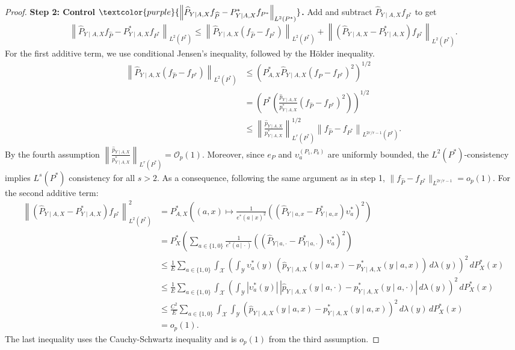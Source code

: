 \documentclass{article}
\theoremstyle{plain}
\theoremstyle{definition}
\theoremstyle{remark}
\newcommand{\of}[1]{\left(#1\right)}
\newcommand{\abs}[1]{\left|#1\right|}
\newcommand{\cO}{\mathcal{O}}
\newcommand{\cY}{\mathcal{Y}}
\newcommand{\cX}{\mathcal{X}}
\newcommand{\wh}[1]{\widehat{#1}}
\newcommand{\hP}{\widehat{P}}
\newcommand{\1}{\mathbbm{1}}
\newcommand{\norm}[1]{\left \| #1 \right \|}
\theoremstyle{plain}
\theoremstyle{definition}
\newcommand{\mymid}{\,|\,}
\begin{document}
\begin{proof}
    \textbf{Step 2: Control $\textcolor{purple}{\norm{\hP_{Y \mid A, X}f_{\hP} - P^*_{Y \mid A, X}f_{P^*}}_{L^2(P^*)}}$.} Add and subtract $\hP_{Y \mid A, X} f_{P^*}$ to get
    \[
    \norm{\hP_{Y \mid A, X}f_{\hP} - P^*_{Y \mid A, X}f_{P^*}}_{L^2(P^*)} \leq \norm{ \hP_{Y \mid A, X} \of{f_{\hP} - f_{P^*}}}_{L^2(P^*)} + \norm{  \of{\hP_{Y \mid A, X} - P^*_{Y \mid A, X}} f_{P^*}}_{L^2(P^*)}.
    \]
    For the first additive term, we use conditional Jensen's inequality, followed by the Hölder inequality.
    \begin{align*}
        \norm{\hP_{Y \mid A, X} \of{f_{\hP} - f_{P^*}}}_{L^2(P^*)} &\leq \of{P^*_{A, X} \hP_{Y \mid A, X} (f_{\hP} -f_{P^*})^2}^{1/2}\\
        &= \of{P^* \of {\frac{\wh{p}_{Y \mid A, X}}{p^*_{Y \mid A, X}} (f_{\hP} -f_{P^*})^2}}^{1/2}\\
        &\leq \norm{\frac{\wh{p}_{Y \mid A, X}}{p^*_{Y \mid A, X}}}_{L^r(P^*)}^{1/2}  \norm{f_{\hP} - f_{P^*}}_{L^{2r/r-1}(P^*)}.
    \end{align*}
    By the fourth assumption $\norm{\frac{\wh{p}_{Y \mid A, X}}{p^*_{Y \mid A, X}}}_{L^r(P^*)} = \cO_p(1)$. Moreover, since $e_P$ and $\upsilon_a^{(P_1,P_0)}$ are uniformly bounded, the $L^2(P^*)$-consistency implies $L^s(P^*)$ consistency for all $s > 2$. As a  consequence, following the same argument as in step 1, $\|f_{\hP} - f_{P^*} \|_{L^{2r/r-1}} = o_p(1)$.
    For the second additive term:
    \begin{align*}
        \norm{  \of{\hP_{Y \mid A, X} - P^*_{Y \mid A, X}} f_{P^*}}_{L^2(P^*)}^2 &= P^*_{A, X} \of{(a,x) \mapsto \frac{1}{e^*(a \mid x)^2} \of{\of{\hP_{Y \mid a, x} - P^*_{Y \mid a, x}} \upsilon_a^*}^2} \\
        &= P^*_X \of{\sum_{a \in \{1,0\}} \frac{1}{e^*(a \mymid \cdot)} \of{(\hP_{Y \mymid a, \cdot} - P^*_{Y \mymid a, \cdot}) \, \upsilon_a^*}^2}\\
        &\leq \frac{1}{E} \sum_{a \in \{1,0\}}  \int_\cX \of{\int_\cY \upsilon_a^*(y) \, (\hat{p}_{Y \mid A, X} (y \mid a, x) - {p}^*_{Y \mid A, X} (y \mid a, x)) \, d\lambda(y)}^2 \, dP_X^*(x) \\
        &\leq \frac{1}{E} \sum_{a \in \{1,0\}}  \int_\cX \of{\int_\cY \abs{\upsilon_a^*(y)} \, \abs{\hat{p}_{Y \mid A, X} (y \mid a, \cdot) - {p}^*_{Y \mid A, X} (y \mid a, \cdot)} \, d\lambda(y)}^2 \, dP_X^*(x) \\
        &\leq \frac{C^2}{E} \sum_{a \in \{1,0\}}  \int_\cX \int_\cY \of{\hat{p}_{Y \mid A, X} (y \mid a, x) - {p}^*_{Y \mid A, X} (y \mid a, x)}^2 \, d\lambda(y) \, dP_X^*(x)\\
        &= o_p(1).
    \end{align*}
    The last inequality uses the Cauchy-Schwartz inequality and is $o_p(1)$ from the third assumption.


\end{proof}
\end{document}
